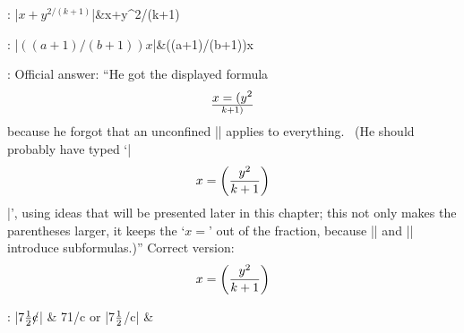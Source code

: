 :
\beginmathdemo
|$x+y^{2/(k+1)}$|&x+y^{2/(k+1)}\cr
\endmathdemo

:
\beginmathdemo
|$((a+1)/(b+1))x$|&((a+1)/(b+1))x\cr
\endmathdemo

:
Official answer: ``He got the displayed formula$$x=(y^2\over k+1)$$ because he forgot
that an unconfined |\over| applies to everything.  \ (He should probably
have typed `|$$x=\left(y^2\over k+1\right)$$|', using ideas that will be
presented later in this chapter; this not only makes the parentheses
larger, it keeps the `$x=$' out of the fraction, because |\left| and
|\right| introduce subformulas.)''\parbreak
Correct version: $$x=\left(y^2\over k+1\right)$$

:
\def\cents{\hbox{\rm\rlap/c}}
\beginmathdemo
|$7{1\over2}\cents$| & 7{1}\cents\cr
or |7$1\over2$\cents| & \cr
\endmathdemo


\bye
